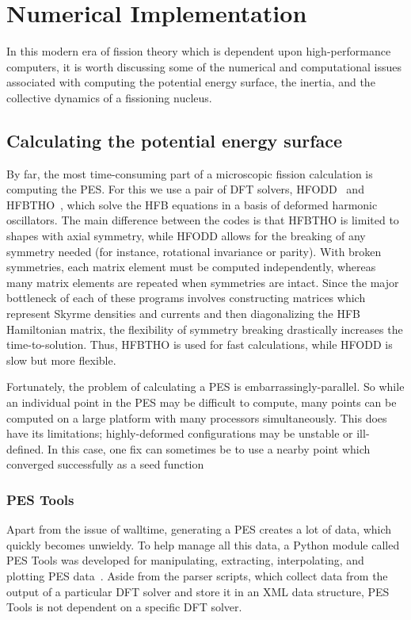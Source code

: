 \chapter{Numerical Implementation}\label{chap:Numerical}

In this modern era of fission theory which is dependent upon high-performance computers, it is worth discussing some of the numerical and computational issues associated with computing the potential energy surface, the inertia, and the collective dynamics of a fissioning nucleus.

\section{Calculating the potential energy surface}
By far, the most time-consuming part of a microscopic fission calculation is computing the PES. For this we use a pair of DFT solvers, HFODD~\cite{Schunck2017} and HFBTHO~\cite{Perez2017}, which solve the HFB equations in a basis of deformed harmonic oscillators. The main difference between the codes is that HFBTHO is limited to shapes with axial symmetry, while HFODD allows for the breaking of any symmetry needed (for instance, rotational invariance or parity). With broken symmetries, each matrix element must be computed independently, whereas many matrix elements are repeated when symmetries are intact. Since the major bottleneck of each of these programs involves constructing matrices which represent Skyrme densities and currents and then diagonalizing the HFB Hamiltonian matrix, the flexibility of symmetry breaking drastically increases the time-to-solution. Thus, HFBTHO is used for fast calculations, while HFODD is slow but more flexible.

Fortunately, the problem of calculating a PES is embarrassingly-parallel. So while an individual point in the PES may be difficult to compute, many points can be computed on a large platform with many processors simultaneously. This does have its limitations; highly-deformed configurations may be unstable or ill-defined. In this case, one fix can sometimes be to use a nearby point which converged successfully as a seed function


\subsection{PES Tools}
Apart from the issue of walltime, generating a PES creates a lot of data, which quickly becomes unwieldy. To help manage all this data, a Python module called PES Tools was developed for manipulating, extracting, interpolating, and plotting PES data~\cite{PES_tools}. Aside from the parser scripts, which collect data from the output of a particular DFT solver and store it in an XML data structure, PES Tools is not dependent on a specific DFT solver.

